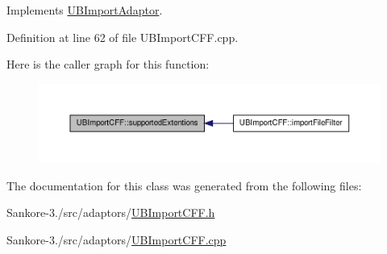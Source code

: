 Implements \hyperlink{class_u_b_import_adaptor_a1267230fb2a55109acc8f891044d0ee8}{U\-B\-Import\-Adaptor}.



Definition at line 62 of file U\-B\-Import\-C\-F\-F.\-cpp.



Here is the caller graph for this function\-:
\nopagebreak
\begin{figure}[H]
\begin{center}
\leavevmode
\includegraphics[width=350pt]{db/d5b/class_u_b_import_c_f_f_a516545307bebac521aecee513954645d_icgraph}
\end{center}
\end{figure}




The documentation for this class was generated from the following files\-:\begin{DoxyCompactItemize}
\item 
Sankore-\/3./src/adaptors/\hyperlink{_u_b_import_c_f_f_8h}{U\-B\-Import\-C\-F\-F.\-h}\item 
Sankore-\/3./src/adaptors/\hyperlink{_u_b_import_c_f_f_8cpp}{U\-B\-Import\-C\-F\-F.\-cpp}\end{DoxyCompactItemize}
